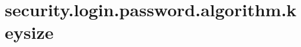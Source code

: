 \section{security.login.password.algorithm.keysize}
\label{configuration:SecurityLoginPasswordAlgorithmKeysize}
\TODO
